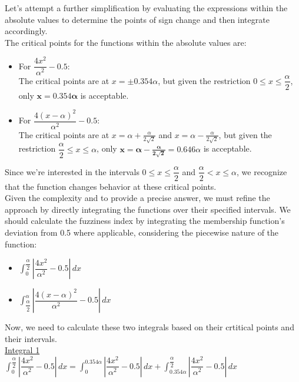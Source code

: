 Let's attempt a further simplification by evaluating the expressions within the absolute values to determine the points of sign change and then integrate accordingly. ​\\

The critical points for the functions within the absolute values are:
\begin{itemize}
	\item For $\dfrac{4x^2}{\alpha^2} - 0.5$:\\
		The critical points are at $x = \pm 0.354\alpha$, but given the restriction $0 \leq x \leq \dfrac{\alpha}{2}$, only $\mathbf{x = 0.354\alpha}$ is acceptable.
	
	\item  For $\dfrac{4(x-\alpha)^2}{\alpha^2} - 0.5$:\\
		The critical points are at $x = \alpha + \frac{\alpha}{2\sqrt{2}}$ and $x = \alpha - \frac{\alpha}{2\sqrt{2}}$, but given the restriction $\dfrac{\alpha}{2} \leq x \leq \alpha$, only $\mathbf{x = \alpha - \frac{\alpha}{2\sqrt{2}}} = 0.646\alpha$ is acceptable.
\end{itemize}
Since we're interested in the intervals $0 \leq x \leq \dfrac{\alpha}{2}$ and $\dfrac{\alpha}{2} < x \leq \alpha$, we recognize that the function changes behavior at these critical points. \\

Given the complexity and to provide a precise answer, we must refine the approach by directly integrating the functions over their specified intervals. We should calculate the fuzziness index by integrating the membership function's deviation from 0.5 where applicable, considering the piecewise nature of the function:
\begin{itemize}
	\item $\displaystyle \int_{0}^{\dfrac{\alpha}{2}} \left| \dfrac{4x^2}{\alpha^2} - 0.5 \right| \, dx$
	\item $\displaystyle \int_{\dfrac{\alpha}{2}}^{\alpha} \left| \dfrac{4(x-\alpha)^2}{\alpha^2} - 0.5 \right| \, dx$	
\end{itemize}

Now, we need to calculate these two integrals based on their crtitical points and their intervals.\\

\underline{Integral 1}\\

$\displaystyle \int_{0}^{\dfrac{\alpha}{2}} \left| \dfrac{4x^2}{\alpha^2} - 0.5 \right| \, dx = \displaystyle \int_{0}^{0.354\alpha} \left| \dfrac{4x^2}{\alpha^2} - 0.5 \right| \, dx+ \int_{0.354\alpha}^{\dfrac{\alpha}{2}} \left|\dfrac{4x^2}{\alpha^2} - 0.5\right| \, dx$
\\

